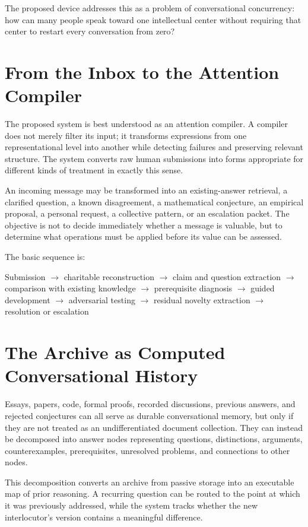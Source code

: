 \documentclass[11pt]{article}
\begin{document}
The proposed device addresses this as a problem of conversational concurrency: how can many people speak toward one intellectual center without requiring that center to restart every conversation from zero?

\section{From the Inbox to the Attention Compiler}

The proposed system is best understood as an attention compiler. A compiler does not merely filter its input; it transforms expressions from one representational level into another while detecting failures and preserving relevant structure. The system converts raw human submissions into forms appropriate for different kinds of treatment in exactly this sense.

An incoming message may be transformed into an existing-answer retrieval, a clarified question, a known disagreement, a mathematical conjecture, an empirical proposal, a personal request, a collective pattern, or an escalation packet. The objective is not to decide immediately whether a message is valuable, but to determine what operations must be applied before its value can be assessed.

The basic sequence is:

\begin{center}
Submission $\rightarrow$ charitable reconstruction $\rightarrow$ claim and question extraction $\rightarrow$ comparison with existing knowledge $\rightarrow$ prerequisite diagnosis $\rightarrow$ guided development $\rightarrow$ adversarial testing $\rightarrow$ residual novelty extraction $\rightarrow$ resolution or escalation
\end{center}

\section{The Archive as Computed Conversational History}

Essays, papers, code, formal proofs, recorded discussions, previous answers, and rejected conjectures can all serve as durable conversational memory, but only if they are not treated as an undifferentiated document collection. They can instead be decomposed into answer nodes representing questions, distinctions, arguments, counterexamples, prerequisites, unresolved problems, and connections to other nodes.

This decomposition converts an archive from passive storage into an executable map of prior reasoning. A recurring question can be routed to the point at which it was previously addressed, while the system tracks whether the new interlocutor's version contains a meaningful difference.
\end{document}
